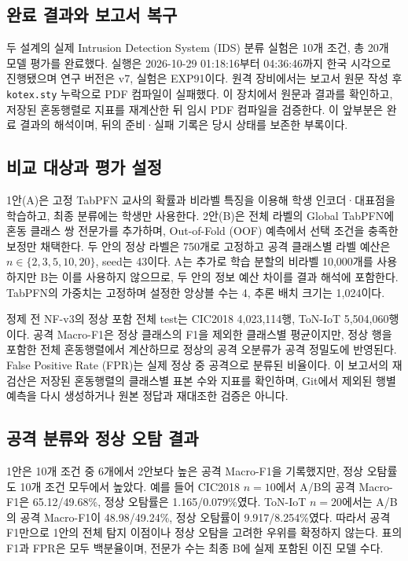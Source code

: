 

\subsection{완료 결과와 보고서 복구}
두 설계의 실제 Intrusion Detection System (IDS) 분류 실험은 10개 조건, 총 20개 모델 평가를 완료했다.
실행은 2026-10-29 01:18:16부터 04:36:46까지 한국 시각으로 진행됐으며 연구 버전은 v7, 실험은 EXP91이다.
원격 장비에서는 보고서 원문 작성 후 \texttt{kotex.sty} 누락으로 PDF 컴파일이 실패했다.
이 장치에서 원문과 결과를 확인하고, 저장된 혼동행렬로 지표를 재계산한 뒤 임시 PDF 컴파일을 검증한다.
이 앞부분은 완료 결과의 해석이며, 뒤의 준비·실패 기록은 당시 상태를 보존한 부록이다.


\subsection{비교 대상과 평가 설정}
1안(A)은 고정 TabPFN 교사의 확률과 비라벨 특징을 이용해 학생 인코더·대표점을 학습하고, 최종 분류에는 학생만 사용한다.
2안(B)은 전체 라벨의 Global TabPFN에 혼동 클래스 쌍 전문가를 추가하며, Out-of-Fold (OOF) 예측에서 선택 조건을 충족한 보정만 채택한다.
두 안의 정상 라벨은 750개로 고정하고 공격 클래스별 라벨 예산은 $n\in\{2,3,5,10,20\}$, seed는 43이다.
A는 추가로 학습 분할의 비라벨 10,000개를 사용하지만 B는 이를 사용하지 않으므로, 두 안의 정보 예산 차이를 결과 해석에 포함한다.
TabPFN의 가중치는 고정하며 설정한 앙상블 수는 4, 추론 배치 크기는 1,024이다.

정제 전 NF-v3의 정상 포함 전체 test는 CIC2018 4,023,114행, ToN-IoT 5,504,060행이다.
공격 Macro-F1은 정상 클래스의 F1을 제외한 클래스별 평균이지만, 정상 행을 포함한 전체 혼동행렬에서 계산하므로 정상의 공격 오분류가 공격 정밀도에 반영된다.
False Positive Rate (FPR)는 실제 정상 중 공격으로 분류된 비율이다.
이 보고서의 재검산은 저장된 혼동행렬의 클래스별 표본 수와 지표를 확인하며, Git에서 제외된 행별 예측을 다시 생성하거나 원본 정답과 재대조한 검증은 아니다.

\subsection{공격 분류와 정상 오탐 결과}
1안은 10개 조건 중 6개에서 2안보다 높은 공격 Macro-F1을 기록했지만, 정상 오탐률도 10개 조건 모두에서 높았다.
예를 들어 CIC2018 $n=10$에서 A/B의 공격 Macro-F1은 65.12/49.68\%, 정상 오탐률은 1.165/0.079\%였다.
ToN-IoT $n=20$에서는 A/B의 공격 Macro-F1이 48.98/49.24\%, 정상 오탐률이 9.917/8.254\%였다.
따라서 공격 F1만으로 1안의 전체 탐지 이점이나 정상 오탐을 고려한 우위를 확정하지 않는다.
표의 F1과 FPR은 모두 백분율이며, 전문가 수는 최종 B에 실제 포함된 이진 모델 수다.

